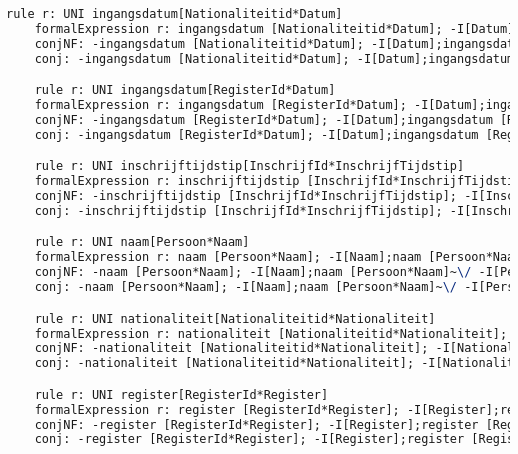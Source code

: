 \begin{lstlisting}[language=TeX]
    rule r: UNI ingangsdatum[Nationaliteitid*Datum]
    formalExpression r: ingangsdatum [Nationaliteitid*Datum]; -I[Datum];ingangsdatum [Nationaliteitid*Datum]~ |- -I[Nationaliteitid]
    conjNF: -ingangsdatum [Nationaliteitid*Datum]; -I[Datum];ingangsdatum [Nationaliteitid*Datum]~\/ -I[Nationaliteitid]
    conj: -ingangsdatum [Nationaliteitid*Datum]; -I[Datum];ingangsdatum [Nationaliteitid*Datum]~\/ -I[Nationaliteitid]

    rule r: UNI ingangsdatum[RegisterId*Datum]
    formalExpression r: ingangsdatum [RegisterId*Datum]; -I[Datum];ingangsdatum [RegisterId*Datum]~ |- -I[RegisterId]
    conjNF: -ingangsdatum [RegisterId*Datum]; -I[Datum];ingangsdatum [RegisterId*Datum]~\/ -I[RegisterId]
    conj: -ingangsdatum [RegisterId*Datum]; -I[Datum];ingangsdatum [RegisterId*Datum]~\/ -I[RegisterId]

    rule r: UNI inschrijftijdstip[InschrijfId*InschrijfTijdstip]
    formalExpression r: inschrijftijdstip [InschrijfId*InschrijfTijdstip]; -I[InschrijfTijdstip];inschrijftijdstip [InschrijfId*InschrijfTijdstip]~ |- -I[InschrijfId]
    conjNF: -inschrijftijdstip [InschrijfId*InschrijfTijdstip]; -I[InschrijfTijdstip];inschrijftijdstip [InschrijfId*InschrijfTijdstip]~\/ -I[InschrijfId]
    conj: -inschrijftijdstip [InschrijfId*InschrijfTijdstip]; -I[InschrijfTijdstip];inschrijftijdstip [InschrijfId*InschrijfTijdstip]~\/ -I[InschrijfId]

    rule r: UNI naam[Persoon*Naam]
    formalExpression r: naam [Persoon*Naam]; -I[Naam];naam [Persoon*Naam]~ |- -I[Persoon]
    conjNF: -naam [Persoon*Naam]; -I[Naam];naam [Persoon*Naam]~\/ -I[Persoon]
    conj: -naam [Persoon*Naam]; -I[Naam];naam [Persoon*Naam]~\/ -I[Persoon]

    rule r: UNI nationaliteit[Nationaliteitid*Nationaliteit]
    formalExpression r: nationaliteit [Nationaliteitid*Nationaliteit]; -I[Nationaliteit];nationaliteit [Nationaliteitid*Nationaliteit]~ |- -I[Nationaliteitid]
    conjNF: -nationaliteit [Nationaliteitid*Nationaliteit]; -I[Nationaliteit];nationaliteit [Nationaliteitid*Nationaliteit]~\/ -I[Nationaliteitid]
    conj: -nationaliteit [Nationaliteitid*Nationaliteit]; -I[Nationaliteit];nationaliteit [Nationaliteitid*Nationaliteit]~\/ -I[Nationaliteitid]

    rule r: UNI register[RegisterId*Register]
    formalExpression r: register [RegisterId*Register]; -I[Register];register [RegisterId*Register]~ |- -I[RegisterId]
    conjNF: -register [RegisterId*Register]; -I[Register];register [RegisterId*Register]~\/ -I[RegisterId]
    conj: -register [RegisterId*Register]; -I[Register];register [RegisterId*Register]~\/ -I[RegisterId]


\end{lstlisting}
